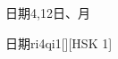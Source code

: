 \begin{entry}{日期}{4,12}{⽇、⽉}
  \begin{phonetics}{日期}{ri4qi1}[][HSK 1]
  \end{phonetics}
\end{entry}
